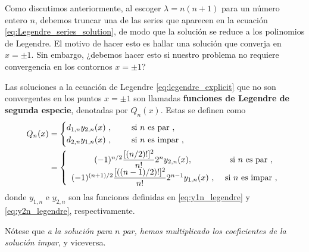Como discutimos anteriormente, al escoger $\lambda = n(n+1)$ para un número entero $n$, debemos truncar una de las series que aparecen en la ecuación \eqref{eq:Legendre_series_solution}, de modo que la solución se reduce a los polinomios de Legendre. El motivo de hacer esto es hallar una solución que converja en $x = \pm 1$. Sin embargo, ¿debemos hacer esto si nuestro problema no requiere convergencia en los contornos $x = \pm 1$?

\begin{defi}
    Las soluciones a la ecuación de Legendre \eqref{eq:legendre_explicit} que no son convergentes en los puntos $x = \pm 1$ son llamadas \textbf{funciones de Legendre de segunda especie}, denotadas por $Q_n(x)$. Estas se definen como
    \begin{align} \label{eq:legendre-second-kind}
        Q_n(x) & = \begin{dcases}
            d_{1,n} y_{2,n}(x) \ , \qquad \text{ si } n \text{ es par} \ , \\
            d_{2,n} y_{1,n}(x) \ , \qquad \text{ si } n \text{ es impar} \ ,
        \end{dcases} \\
        & = \left\{ \begin{array}{cc}
            (-1)^{n/2} \dfrac{[(n/2)!]^2}{n!} 2^n y_{2,n}(x) , & \text{ si } n \text{ es par} \ , \\
            (-1)^{(n+1)/2} \dfrac{[\left((n-1)/2\right)!]^2}{n!} 2^{n-1} y_{1,n}(x) \ , & \text{ si } n \text{ es impar} \ ,
        \end{array} \right.
    \end{align}
    donde $y_{1,n}$ e $y_{2,n}$ son las funciones definidas en \eqref{eq:y1n_legendre} y \eqref{eq:y2n_legendre}, respectivamente. 
    
    Nótese que \emph{a la solución para} $n$ \emph{par, hemos multiplicado los coeficientes de la solución impar}, y viceversa.
\end{defi}

